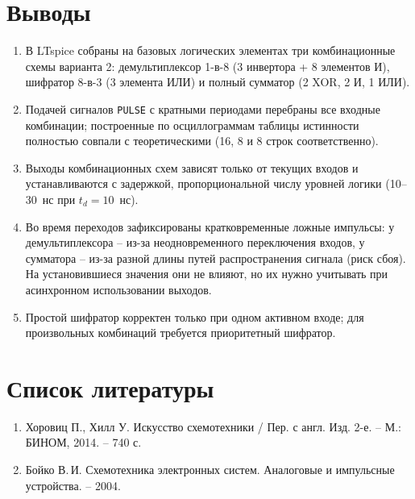 \documentclass[14pt]{extarticle}
\begin{document}
\section*{Выводы}
\begin{enumerate}[leftmargin=*, label=\arabic*.]
\item В LTspice собраны на базовых логических элементах три комбинационные схемы варианта 2:
демультиплексор 1-в-8 (3 инвертора + 8 элементов И), шифратор 8-в-3 (3 элемента ИЛИ) и
полный сумматор (2 XOR, 2 И, 1 ИЛИ).
\item Подачей сигналов \texttt{PULSE} с кратными периодами перебраны все входные
комбинации; построенные по осциллограммам таблицы истинности полностью совпали с
теоретическими (16, 8 и 8 строк соответственно).
\item Выходы комбинационных схем зависят только от текущих входов и устанавливаются с
задержкой, пропорциональной числу уровней логики (10--30~нс при $t_d=10$~нс).
\item Во время переходов зафиксированы кратковременные ложные импульсы: у демультиплексора
-- из-за неодновременного переключения входов, у сумматора -- из-за разной длины путей
распространения сигнала (риск сбоя). На установившиеся значения они не влияют, но их нужно
учитывать при асинхронном использовании выходов.
\item Простой шифратор корректен только при одном активном входе; для произвольных
комбинаций требуется приоритетный шифратор.
\end{enumerate}

\section*{Список литературы}
\begin{enumerate}[leftmargin=*, label=\arabic*.]
\item Хоровиц П., Хилл У. Искусство схемотехники / Пер. с англ. Изд. 2-е. -- М.: БИНОМ, 2014. -- 740 с.
\item Бойко В.\,И. Схемотехника электронных систем. Аналоговые и импульсные устройства. -- 2004.
\end{enumerate}
\end{document}
